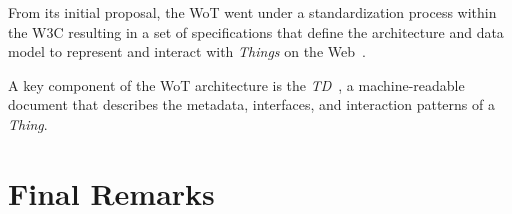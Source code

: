 From its initial proposal, the \ac{WoT} went under a standardization process within the \ac{W3C} resulting in a set of specifications that define the architecture and data model to represent and interact with \emph{Things} on the Web~\cite{wot-arch,wot-td}.

A key component of the \ac{WoT} architecture is the \emph{\ac{TD}}~\cite{wot-td}, a machine-readable document that describes the metadata, interfaces, and interaction patterns of a \emph{Thing}.









\section{Final Remarks}
